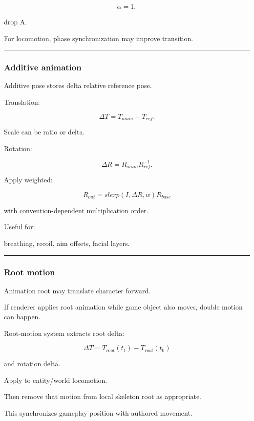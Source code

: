 \[
\alpha=1,
\]

drop A.

For locomotion, phase synchronization may improve transition.

\begin{center}\rule{0.5\linewidth}{0.5pt}\end{center}

\subsubsection{Additive animation}\label{additive-animation}

Additive pose stores delta relative reference pose.

Translation:

\[
\Delta T=
T_{anim}-T_{ref}.
\]

Scale can be ratio or delta.

Rotation:

\[
\Delta R=
R_{anim}R_{ref}^{-1}.
\]

Apply weighted:

\[
R_{out}
=
slerp(
I,
\Delta R,
w
)
R_{base}
\]

with convention-dependent multiplication order.

Useful for:

breathing, recoil, aim offsets, facial layers.

\begin{center}\rule{0.5\linewidth}{0.5pt}\end{center}

\subsubsection{Root motion}\label{root-motion}

Animation root may translate character forward.

If renderer applies root animation while game object also moves, double motion can happen.

Root-motion system extracts root delta:

\[
\Delta T=
T_{root}(t_1)
-
T_{root}(t_0)
\]

and rotation delta.

Apply to entity/world locomotion.

Then remove that motion from local skeleton root as appropriate.

This synchronizes gameplay position with authored movement.

